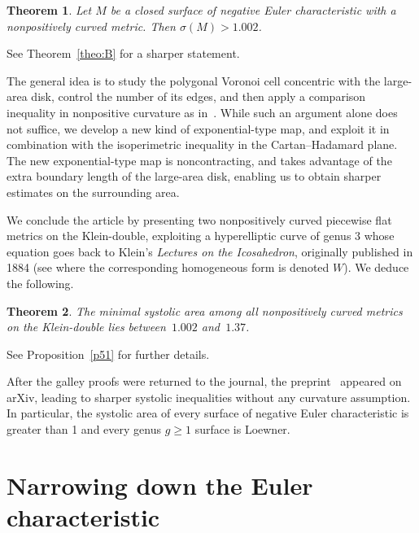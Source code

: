\documentclass[12pt,reqno]{amsart}
\newtheorem{theoremABC}{Theorem}
\theoremstyle{definition}
\numberwithin{equation}{section}
\newcommand{\RP}{{\mathbb R\mathbb P}}
\numberwithin{equation}{section}
\begin{document}
\begin{theoremABC}
\label{BB}
Let $M$ be a closed surface of negative Euler characteristic with a
nonpositively curved metric.  Then $\sigma(M) > 1.002$.
\end{theoremABC}
See Theorem~\ref{theo:B} for a sharper statement.

The general idea is to study the polygonal Voronoi cell concentric
with the large-area disk, control the number of its edges, and then
apply a comparison inequality in nonpositive curvature as
in~\cite{KS06}.  While such an argument alone does not suffice, we
develop a new kind of exponential-type map, and exploit it in
combination with the isoperimetric inequality in the Cartan--Hadamard
plane.  The new exponential-type map is noncontracting, and takes
advantage of the extra boundary length of the large-area disk,
enabling us to obtain sharper estimates on the surrounding area.

\forgotten


We conclude the article by presenting two nonpositively curved
piecewise flat metrics on the Klein-double, exploiting a hyperelliptic
curve of genus $3$ whose equation goes back to Klein's \emph{Lectures
on the Icosahedron}, originally published in 1884 (see \cite[II,
  \S12]{Kl56} where the corresponding homogeneous form is denoted
$W$).  We deduce the following.

\begin{theoremABC}
The minimal systolic area among all nonpositively curved metrics on
the Klein-double lies between~$1.002$ and~$1.37$.
\end{theoremABC}

See Proposition~\ref{p51} for further details. 

\medskip


After the galley proofs were returned to the journal, the
preprint~\cite{CV} appeared on arXiv, leading to sharper systolic
inequalities without any curvature assumption.  In particular, the
systolic area of every surface of negative Euler characteristic is
greater than 1 and every genus $g\geq1$ surface is Loewner.


\section{Narrowing down the Euler characteristic} \label{sec:two}

\end{document}
